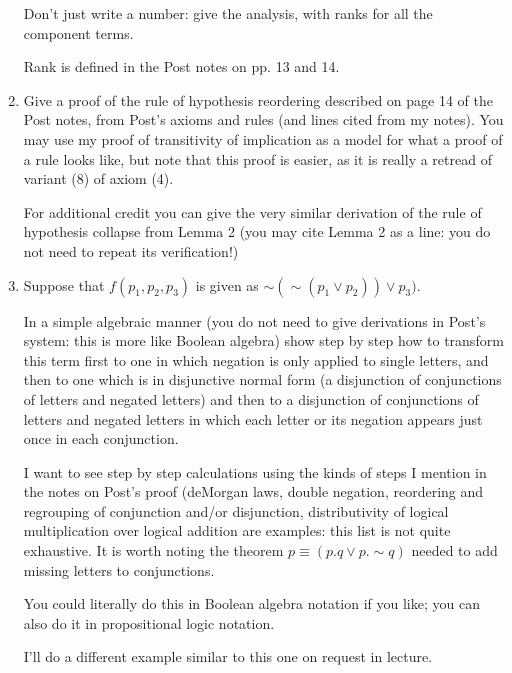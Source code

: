 \documentclass[12pt]{article}
\begin{document}
\begin{enumerate}
Don't just write a number:  give the analysis, with ranks for all the component terms.

Rank is defined in the Post notes on pp. 13 and 14.

\item  Give a proof of the rule of hypothesis reordering described on page 14 of the Post notes, from Post's axioms and rules (and lines cited from my notes).  You may use my proof of transitivity of implication as a model for what a proof of a rule looks like,
but note that this proof is easier, as it is really a retread of variant (8) of axiom (4).

For additional credit you can give the very similar derivation of the rule of hypothesis collapse from Lemma 2 (you may cite Lemma 2 as a line:  you do not need to repeat its verification!)


\item  Suppose that $f(p_1,p_2,p_3)$ is given as $\sim (\sim(p_1 \vee p_2)) \vee p_3)$.

In a simple algebraic manner (you do not need to give derivations in Post's system:  this is more like Boolean algebra) show step by step how to transform
this term first to one in which negation is only applied to single letters, and then to one which is in disjunctive normal form (a disjunction of conjunctions of letters and negated letters)
and then to a disjunction of conjunctions of letters and negated letters in which each letter or its negation appears just once in each conjunction.

I want to see step by step calculations using the kinds of steps I mention in the notes on Post's proof (deMorgan laws, double negation, reordering and regrouping of conjunction
and/or disjunction, distributivity of logical multiplication over logical addition are examples:  this list is not quite exhaustive.  It is worth noting the theorem $p \equiv (p.q \vee p.\sim q)$ needed to add missing letters to conjunctions.

You could literally do this in Boolean algebra notation if you like;  you can also do it in propositional logic notation.

I'll do a different example similar to this one on request in lecture.

\end{enumerate}
\end{document}
